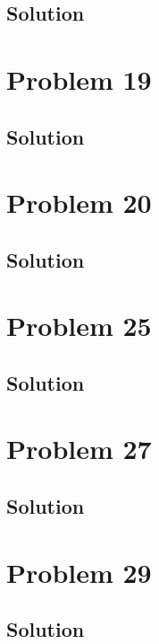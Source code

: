 \documentclass[12pt]{article}
\begin{document}
        \subsection{Solution}

    \pagebreak
    \section{Problem 19}

        \subsection{Solution}

    \pagebreak
    \section{Problem 20}

        \subsection{Solution}

    \pagebreak
    \section{Problem 25}

        \subsection{Solution}

    \pagebreak
    \section{Problem 27}

        \subsection{Solution}

    \pagebreak
    \section{Problem 29}

        \subsection{Solution}

    \pagebreak
\end{document}
